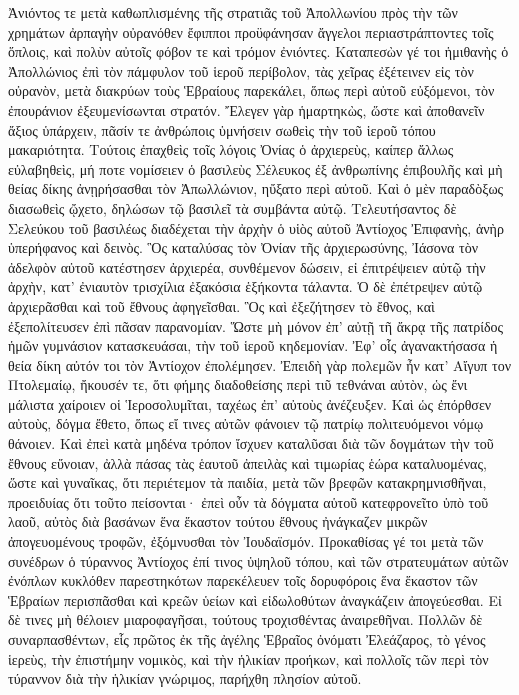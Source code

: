Ἀνιόντος τε μετὰ καθωπλισμένης τῆς στρατιᾶς τοῦ Ἀπολλωνίου πρὸς τὴν τῶν χρημάτων ἀρπαγὴν οὐρανόθεν ἔφιπποι προϋφάνησαν ἄγγελοι περιαστράπτοντες τοῖς ὅπλοις, καὶ πολὺν αὐτοῖς φόβον τε καὶ τρόμον ἐνιόντες. 
Καταπεσὼν γέ τοι ἡμιθανὴς ὁ Ἀπολλώνιος ἐπὶ τὸν πάμφυλον τοῦ ἱεροῦ περίβολον, τὰς χεῖρας ἐξέτεινεν εἰς τὸν οὐρανὸν, μετὰ διακρύων τοὺς Ἑβραίους παρεκάλει, ὅπως περὶ αὐτοῦ εὐξόμενοι, τὸν ἐπουράνιον ἐξευμενίσωνται στρατόν. 
Ἔλεγεν γὰρ ἡμαρτηκὼς, ὥστε καὶ ἀποθανεῖν ἄξιος ὑπάρχειν, πᾶσίν τε ἀνθρώποις ὑμνήσειν σωθεὶς τὴν τοῦ ἱεροῦ τόπου μακαριότητα. 
Τούτοις ἐπαχθεὶς τοῖς λόγοις Ὀνίας ὁ ἀρχιερεὺς, καίπερ ἄλλως εὐλαβηθεὶς, μή ποτε νομίσειεν ὁ βασιλεὺς Σέλευκος ἐξ ἀνθρωπίνης ἐπιβουλῆς καὶ μὴ θείας δίκης ἀνῃρήσασθαι τὸν Ἀπωλλώνιον, ηὔξατο περὶ αὐτοῦ. 
Καὶ ὁ μὲν παραδὸξως διασωθεὶς ᾤχετο, δηλώσων τῷ βασιλεῖ τὰ συμβάντα αὐτῷ. 
Τελευτήσαντος δὲ Σελεύκου τοῦ βασιλέως διαδέχεται τὴν ἀρχὴν ὁ υἱὸς αὐτοῦ Ἀντίοχος Ἐπιφανὴς, ἀνὴρ ὑπερήφανος καὶ δεινὸς. 
Ὃς καταλύσας τὸν Ὀνίαν τῆς ἀρχιερωσύνης, 
Ἰάσονα τὸν ἀδελφὸν αὐτοῦ κατέστησεν ἀρχιερέα, συνθέμενον δώσειν, εἰ ἐπιτρέψειεν αὐτῷ τὴν ἀρχὴν, κατ' ἐνιαυτὸν τρισχίλια ἐξακόσια ἑξήκοντα τάλαντα. 
Ὁ δὲ ἐπέτρεψεν αὐτῷ ἀρχιερᾶσθαι καὶ τοῦ ἔθνους ἀφηγεῖσθαι. 
Ὃς καὶ ἐξεζήτησεν τὸ ἔθνος, καὶ ἐξεπολίτευσεν ἐπὶ πᾶσαν παρανομίαν. 
Ὥστε μὴ μόνον ἐπ' αὐτῇ τῆ ἄκρᾳ τῆς πατρίδος ἡμῶν γυμνάσιον κατασκευάσαι, τὴν τοῦ ἱεροῦ κηδεμονίαν. 
Ἐφ' οἷς ἀγανακτήσασα ἡ θεία δίκη αὐτόν τοι τὸν Ἀντίοχον ἐπολέμησεν. 
Ἐπειδὴ γὰρ πολεμῶν ἦν κατ' Αἴγυπ τον Πτολεμαίῳ, ἤκουσέν τε, ὅτι φήμης διαδοθείσης περὶ τιῦ τεθνάναι αὐτὸν, ὡς ἔνι μάλιστα χαίροιεν οἱ Ἱεροσολυμῖται, ταχέως ἐπ' αὐτοὺς ἀνέζευξεν. 
Καὶ ὡς ἐπόρθσεν αὐτοὺς, δόγμα ἔθετο, ὅπως εἴ τινες αὐτῶν φάνοιεν τῷ πατρίῳ πολιτευόμενοι νόμῳ θάνοιεν. 
Καὶ ἐπεὶ κατὰ μηδένα τρόπον ἴσχυεν καταλῦσαι διὰ τῶν δογμάτων τὴν τοῦ ἔθνους εὔνοιαν, ἀλλὰ πάσας τὰς ἑαυτοῦ ἀπειλὰς καὶ τιμωρίας ἑώρα καταλυομένας, 
ὥστε καὶ γυναῖκας, ὅτι περιέτεμον τὰ παιδία, μετὰ τῶν βρεφῶν κατακρημνισθῆναι, προειδυίας ὅτι τοῦτο πείσονται· 
ἐπεὶ οὖν τὰ δόγματα αὑτοῦ κατεφρονεῖτο ὑπὸ τοῦ λαοῦ, αὐτὸς διὰ βασάνων ἕνα ἕκαστον τούτου ἔθνους ἠνάγκαζεν μικρῶν ἀπογευομένους τροφῶν, ἐξόμνυσθαι τὸν Ἰουδαϊσμόν. 
Προκαθίσας γέ τοι μετὰ τῶν συνέδρων ὁ τύραννος Ἀντίοχος ἐπί τινος ὑψηλοῦ τόπου, 
καὶ τῶν στρατευμάτων αὐτῶν ἐνόπλων κυκλόθεν παρεστηκότων παρεκέλευεν τοῖς δορυφόροις ἕνα ἕκαστον τῶν Ἑβραίων περισπᾶσθαι καὶ κρεῶν ὑείων καὶ εἰδωλοθύτων ἀναγκάζειν ἀπογεύεσθαι. 
Εἰ δὲ τινες μὴ θέλοιεν μιαροφαγῆσαι, τούτους τροχισθέντας ἀναιρεθῆναι. 
Πολλῶν δὲ συναρπασθέντων, εἷς πρῶτος ἐκ τῆς ἀγέλης Ἑβραῖος ὀνόματι Ἐλεάζαρος, τὸ γένος ἱερεὺς, τὴν ἐπιστήμην νομικὸς, καὶ τὴν ἡλικίαν προήκων, καὶ πολλοῖς τῶν περὶ τὸν τύραννον διὰ τὴν ἡλικίαν γνώριμος, παρήχθη πλησίον αὐτοῦ. 
